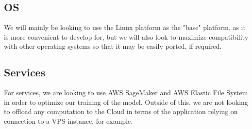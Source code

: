 \documentclass[conference]{IEEEtran}
\begin{document}
\subsection{OS}
We will mainly be looking to use the Linux platform as the "base" platform, as it is more convenient to develop for, but we will also look to maximize compatibility with other operating systems so that it may be easily ported, if required. 
\newline
\subsection{Services}
For services, we are looking to use AWS SageMaker and AWS Elastic File System in order to optimize our training of the model. Outside of this, we are not looking to offload any computation to the Cloud in terms of the application relying on connection to a VPS instance, for example.
\newline
\end{document}
